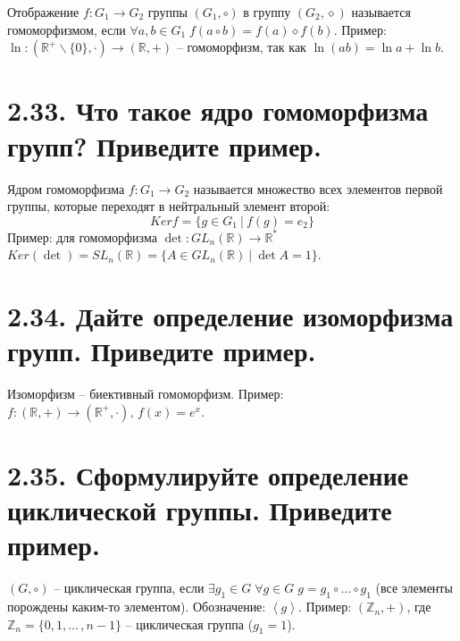\documentclass{article}
\begin{document}
Отображение $f : G_1 \rightarrow G_2$ группы $(G_1, \circ)$ в группу $(G_2, \diamond)$ называется гомоморфизмом, если $\forall a, b \in G_1 \; f(a \circ b) = f(a) \diamond f(b)$. 
\newline Пример: $\ln : (\mathbb{R}^+ \backslash \{0\}, \cdot) \rightarrow (\mathbb{R}, +)$ -- гомоморфизм, так как $\ln{(ab)} = \ln{a} + \ln{b}$.

\section*{\LARGE 2.33. Что такое ядро гомоморфизма групп? Приведите пример.  }

Ядром гомоморфизма $f : G_1 \rightarrow G_2$ называется множество всех элементов первой группы, которые переходят в нейтральный элемент второй: $$Kerf = \{g \in G_1 \:|\: f(g) = e_2\}$$
Пример: для гомоморфизма $\det : GL_n(\mathbb{R}) \rightarrow \mathbb{R}^*$ 
\newline $Ker(\det) = SL_n(\mathbb{R}) = \{A \in GL_n(\mathbb{R}) \:|\: \det{A} = 1\}$.

\section*{\LARGE 2.34. Дайте определение изоморфизма групп. Приведите пример. }

Изоморфизм -- биективный гомоморфизм. 
\newline Пример: $f : (\mathbb{R}, +) \rightarrow (\mathbb{R}^+, \cdot), \, f(x) = e^x$.

\section*{\LARGE 2.35. Сформулируйте определение циклической группы. Приведите пример.  }

$(G, \circ)$ -- циклическая группа, если $\exists g_1 \in G \; \forall g \in G \; g = g_1 \circ ... \circ g_1$ (все элементы порождены каким-то элементом). Обозначение: $\left<g\right>$. Пример: $(\mathbb{Z}_n, +)$, где $\mathbb{Z}_n = \{0, 1, ... \,, n - 1\}$ -- циклическая группа ($g_1 = 1$).

\end{document}
